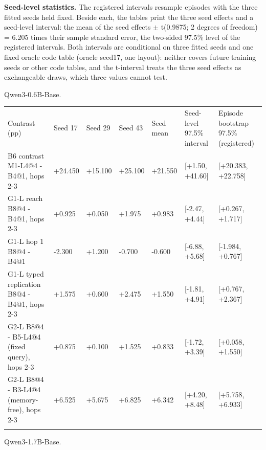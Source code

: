 \textbf{Seed-level statistics.} The registered intervals resample episodes with the three fitted seeds held fixed. Beside each, the tables print the three
seed effects and a seed-level interval: the mean of the seed effects \ensuremath{\pm} t(0.9875; 2 degrees of freedom) = 6.205 times their sample standard
error, the two-sided 97.5\% level of the registered intervals. Both intervals are conditional on three fitted seeds and one fixed oracle code table
(oracle seed17, one layout): neither covers future training seeds or other code tables, and the t-interval treats the three seed effects as exchangeable draws,
which three values cannot test.  %

Qwen3-0.6B-Base.  %


{\footnotesize
\setlength{\tabcolsep}{3pt}
\begin{longtable}{W{287}{14}W{103}{14}W{103}{14}W{103}{14}W{103}{14}W{135}{14}W{165}{14}}
\toprule
Contrast (pp) & Seed 17 & Seed 29 & Seed 43 & Seed mean & Seed-level 97.5\% interval & Episode bootstrap 97.5\% (registered) \\ \addlinespace[3pt]
\midrule \endhead
B6 contrast M1-L4@4 - B4@1, hops 2-3 & +24.450 & +15.100 & +25.100 & +21.550 & [+1.50, +41.60] & [+20.383, +22.758] \\ \addlinespace[3pt]
G1-L reach B8@4 - B4@1, hops 2-3 & +0.925 & +0.050 & +1.975 & +0.983 & [-2.47, +4.44] & [+0.267, +1.717] \\ \addlinespace[3pt]
G1-L hop 1 B8@4 - B4@1 & -2.300 & +1.200 & -0.700 & -0.600 & [-6.88, +5.68] & [-1.984, +0.767] \\ \addlinespace[3pt]
G1-L typed replication B8@4 - B4@1, hops 2-3 & +1.575 & +0.600 & +2.475 & +1.550 & [-1.81, +4.91] & [+0.767, +2.367] \\ \addlinespace[3pt]
G2-L B8@4 - B5-L4@4 (fixed query), hops 2-3 & +0.875 & +0.100 & +1.525 & +0.833 & [-1.72, +3.39] & [+0.058, +1.550] \\ \addlinespace[3pt]
G2-L B8@4 - B3-L4@4 (memory-free), hops 2-3 & +6.525 & +5.675 & +6.825 & +6.342 & [+4.20, +8.48] & [+5.758, +6.933] \\ \addlinespace[3pt]
\bottomrule
\end{longtable}
}


Qwen3-1.7B-Base.  %


